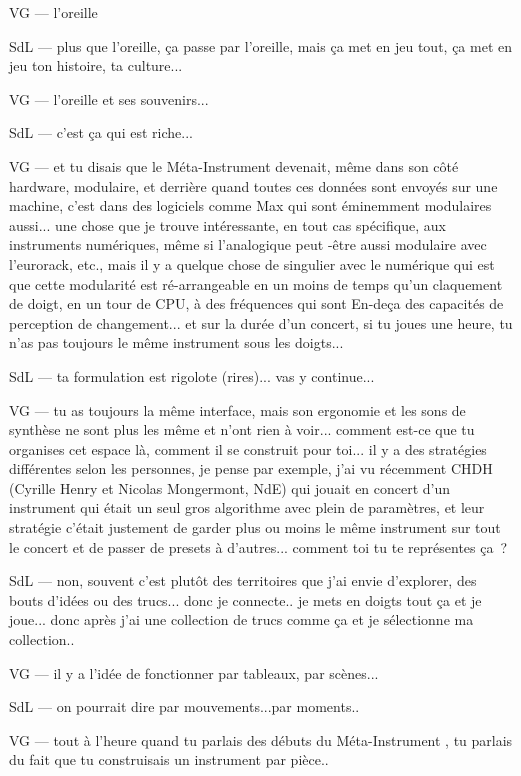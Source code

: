 VG — l'oreille 

SdL — plus que l'oreille, ça passe par l'oreille, mais ça met en jeu tout, ça met en jeu ton histoire, ta culture... 

VG — l'oreille et ses souvenirs... 

SdL — c'est ça qui est riche... 

VG — et tu disais que le Méta-Instrument devenait, même dans son côté hardware, modulaire, et derrière quand toutes ces données sont envoyés sur une machine, c'est dans des logiciels comme Max qui sont éminemment modulaires aussi... une chose que je trouve intéressante, en tout cas spécifique, aux instruments numériques, même si l'analogique peut -être aussi modulaire avec l'eurorack, etc., mais il y a quelque chose de singulier avec le numérique qui est que cette modularité est ré-arrangeable en un moins de temps qu'un claquement de doigt, en un tour de CPU, à des fréquences qui sont En-deça des capacités de perception de changement... et sur la durée d'un concert, si tu joues une heure, tu n'as pas toujours le même instrument sous les doigts... 

SdL — ta formulation est rigolote (rires)... vas y continue... 

VG — tu as toujours la même interface, mais son ergonomie et les sons de synthèse ne sont plus les même et n'ont rien à voir... comment est-ce que tu organises cet espace là, comment il se construit pour toi... il y a des stratégies différentes selon les personnes, je pense par exemple, j'ai vu récemment CHDH (Cyrille Henry et Nicolas Mongermont, NdE) qui jouait en concert d'un instrument qui était un seul gros algorithme avec plein de paramètres, et leur stratégie c'était justement de garder plus ou moins le même instrument sur tout le concert et de passer de presets à d'autres... comment toi tu te représentes ça ? 

SdL — non, souvent c'est plutôt des territoires que j'ai envie d'explorer, des bouts d'idées ou des trucs... donc je connecte.. je mets en doigts tout ça et je joue... donc après j'ai une collection de trucs comme ça et je sélectionne ma collection.. 

VG — il y a l'idée de fonctionner par tableaux, par scènes... 

SdL — on pourrait dire par mouvements...par moments.. 

VG — tout à l'heure quand tu parlais des débuts du Méta-Instrument , tu parlais du fait que tu construisais un instrument par pièce.. 

